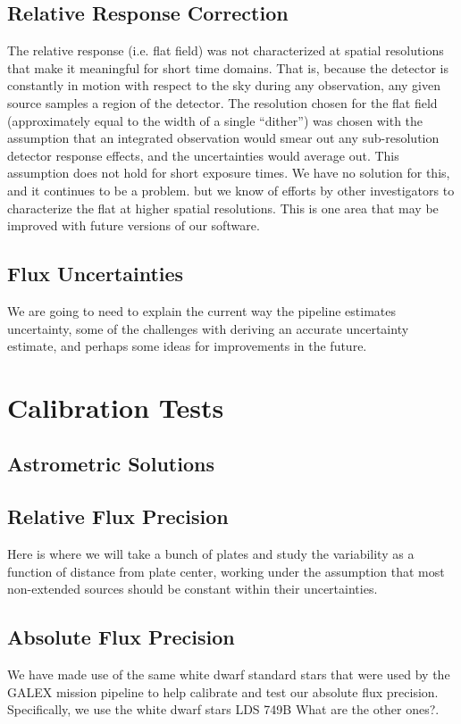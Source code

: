 \documentclass[preprint]{aastex}
\begin{document}
\subsection{Relative Response Correction}
The relative response (i.e. flat field) was not characterized at spatial resolutions that make it meaningful for short time domains. That is, because the detector is constantly in motion with respect to the sky during any observation, any given source samples a region of the detector. The resolution chosen for the flat field (approximately equal to the width of a single ``dither'') was chosen with the assumption that an integrated observation would smear out any sub-resolution detector response effects, and the uncertainties would average out. This assumption does not hold for short exposure times. We have no solution for this, and it continues to be a problem. but we know of efforts by other investigators to characterize the flat at higher spatial resolutions.  This is one area that may be improved with future versions of our software.

\subsection{Flux Uncertainties}
{\color{red}We are going to need to explain the current way the pipeline estimates uncertainty, some of the challenges with deriving an accurate uncertainty estimate, and perhaps some ideas for improvements in the future.}

\section{Calibration Tests}
\label{calibration}

\subsection{Astrometric Solutions}

\subsection{Relative Flux Precision}
{\color{red}Here is where we will take a bunch of plates and study the variability as a function of distance from plate center, working under the assumption that most non-extended sources should be constant within their uncertainties.}

\subsection{Absolute Flux Precision}
We have made use of the same white dwarf standard stars that were used by the GALEX mission pipeline to help calibrate and test our absolute flux precision.  Specifically, we use the white dwarf stars LDS 749B {\color{red}What are the other ones?}.
\end{document}
